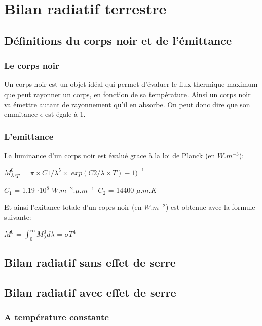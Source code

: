 \documentclass[a4paper, 12pt]{report} %
\begin{document}

\section{Bilan radiatif terrestre}
\subsection{Définitions du corps noir et de l'émittance}

\subsubsection{Le corps noir}
Un corps noir est un objet idéal qui permet d'évaluer le flux thermique maximum
que peut rayonner un corps, en fonction de sa température. Ainsi un corps noir 
va émettre autant de rayonnement qu'il en absorbe. On peut donc dire que son 
emmitance $ \epsilon$  est égale à 1. 

\subsubsection{L'emittance} 

La luminance d'un corps noir est évalué grace à la loi de Planck 
(en $W.m^{-3}$): \vspace{\baselineskip}

\begin{center}
$M^{0}_\lambda,_T=\pi\times C1/\lambda^5\times[exp(C2/\lambda \times T)-1)^{-1}$ 

$C_1$ = 1,19 $\cdot 10^{8}$ $W.m^{-2}.\mu.m^{-1}$\
$C_2$ = 14400 $\mu.m.K$ \\
\end{center}
Et ainsi l'exitance totale d'un coprs noir (en $W.m^{-2}$) est obtenue avec la formule suivante:

\hfil $M^{0}$ = $\int_{0}^{\infty} M^{0}_\lambda d\lambda$ = $\sigma T^{4}$ 

\par

\subsection{Bilan radiatif sans effet de serre} 
\subsection{Bilan radiatif avec effet de serre}
\subsubsection{A température constante}
\end{document}
